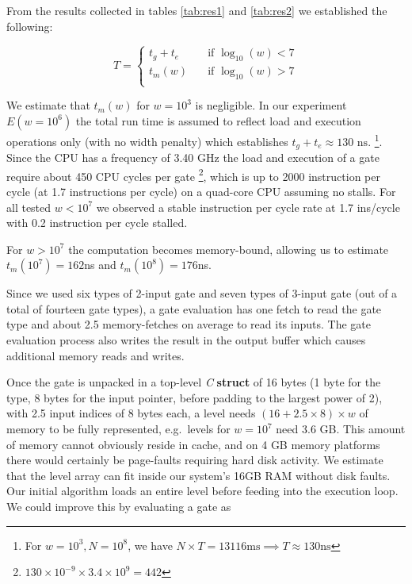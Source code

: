 \par
From the results collected in tables \ref{tab:res1} and \ref{tab:res2} we established the following:

\[ T =
  \begin{cases}
    t_g + t_e       & \quad \text{if } \log_{10}(w) < 7\\
    t_m(w) & \quad \text{if } \log_{10}(w) > 7\\
  \end{cases}
\]

We estimate that $t_m(w)$ for $w = 10^3$ is negligible. In our experiment
$E(w = 10^6)$ the total run time is assumed to reflect load and execution operations
only (with no width penalty) which establishes $t_g + t_e \approx 130\text{ ns}$.
\footnote{ For $w = 10^3, N=10^8$, we have $N \times T = 13116 \text{ms} \implies T \approx 130 \text{ns}$ }.
Since the CPU has a frequency of 3.40 GHz the load and execution of a gate require
about 450 CPU cycles per gate
\footnote{$130 \times 10^{-9} \times 3.4 \times 10^9 = 442$},
which is up to 2000 instruction per cycle (at 1.7 instructions per cycle) on a
quad-core CPU assuming no stalls. For all tested $w < 10^7$ we observed a stable
instruction per cycle rate at 1.7 ins/cycle with 0.2 instruction per cycle stalled.
\par
For $ w > 10^7$ the computation becomes memory-bound, allowing us to
estimate $t_m(10^7) = 162$ns and $t_m(10^8) = 176$ns.
\par
Since we used six types of 2-input gate and seven types of 3-input gate (out of
a total of fourteen gate types), a gate evaluation has one fetch to read the gate
type and about 2.5 memory-fetches on average to read its inputs. The gate
evaluation process also writes the result in the output buffer which causes
additional memory reads and writes.
\par
Once the gate is unpacked in a top-level \textit{C} \textbf{struct} of 16 bytes
(1 byte for the type, 8 bytes for the input pointer, before padding to the largest
power of 2), with 2.5 input indices of 8 bytes each, a level needs
$ (16 + 2.5 \times 8) \times w $ of memory to be fully represented, e.g.\ levels
for $w = 10^7$ need 3.6 GB. This amount of memory cannot obviously reside in cache,
and on 4 GB memory platforms there would certainly be page-faults requiring hard
disk activity. We estimate that the level array can fit inside our system's 16GB
RAM without disk faults. Our initial algorithm loads an entire level before
feeding into the execution loop. We could improve this by evaluating a gate as

